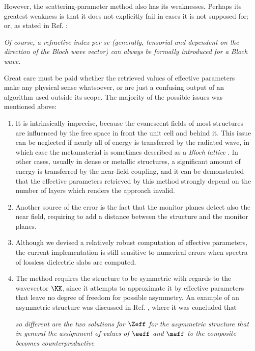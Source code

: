 However, the scattering-parameter method also has its weaknesses. Perhaps its greatest weakness is that it does not explicitly fail in cases it is not supposed for; or, as stated in Ref. \cite{markel2013current}:
\begin{cite} \textit{Of course, a refractive index per se (generally, tensorial and dependent on the direction of the Bloch wave vector) can always be formally introduced for a Bloch wave.} \end{cite}
Great care must be paid whether the retrieved values of effective parameters make any physical sense whatsoever, or are just a confusing output of an algorithm used outside its scope. The majority of the possible issues was mentioned above:
\begin{enumerate}
		 \item{It is intrinsically imprecise, because the evanescent fields of most structures are influenced by the free space in front the unit cell and behind it. This issue can be neglected if nearly all of energy is transferred by the radiated wave, in which case the metamaterial is sometimes described as a \textit{Bloch lattice} \cite{simovski2007bloch, andryieuski2012bloch}. In other cases, usually in dense or metallic structures, a significant amount of energy is transferred by the near-field coupling, and it can be demonstrated that the effective parameters retrieved by this method strongly depend on the number of layers \cite{rockstuhl2008transition,andryieuski2010homogenization} which renders the approach invalid.
			 } 
		 \item{Another source of the error is the fact that the monitor planes detect also the near field, requiring to add a distance between the structure and the monitor planes.} 
		 \item{Although we devised a relatively robust computation of effective parameters, the current implementation is still sensitive to numerical errors when spectra of lossless dielectric slabs are computed.} 
		 \item{The method requires the structure to be symmetric with regards to the wavevector $\KK$, since it attempts to approximate it by effective parameters that leave no degree of freedom for possible asymmetry. An example of an asymmetric structure was discussed in Ref. \cite{smith2005electromagnetic}, where it was concluded that
 \begin{displayquote} \textit{ so different are the two solutions for $\Zeff$ for the asymmetric structure that in general the assignment of values of $\eeff$ and $\meff$ to the composite becomes counterproductive} 

\end{displayquote}}
\end{enumerate}
